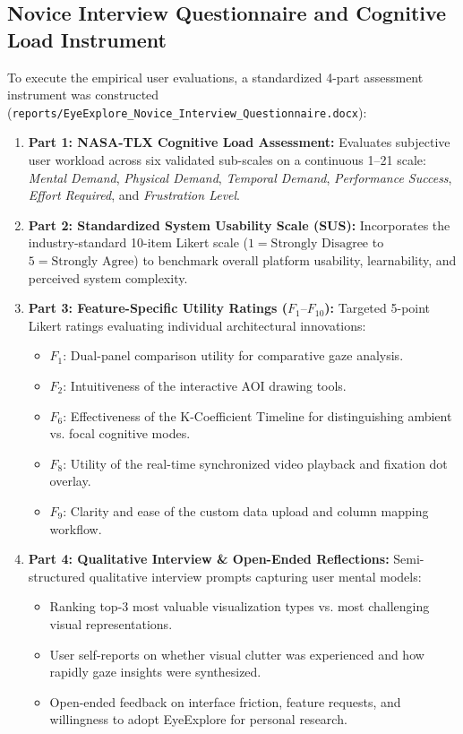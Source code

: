 \documentclass[11pt,a4paper]{article}
\begin{document}
\subsection{Novice Interview Questionnaire and Cognitive Load Instrument}
To execute the empirical user evaluations, a standardized 4-part assessment instrument was constructed (\texttt{reports/EyeExplore\_Novice\_Interview\_Questionnaire.docx}):
\begin{enumerate}
    \item \textbf{Part 1: NASA-TLX Cognitive Load Assessment:} Evaluates subjective user workload across six validated sub-scales on a continuous 1--21 scale: \textit{Mental Demand}, \textit{Physical Demand}, \textit{Temporal Demand}, \textit{Performance Success}, \textit{Effort Required}, and \textit{Frustration Level}.
    \item \textbf{Part 2: Standardized System Usability Scale (SUS):} Incorporates the industry-standard 10-item Likert scale ($1 = \text{Strongly Disagree}$ to $5 = \text{Strongly Agree}$) to benchmark overall platform usability, learnability, and perceived system complexity.
    \item \textbf{Part 3: Feature-Specific Utility Ratings ($F_1\text{--}F_{10}$):} Targeted 5-point Likert ratings evaluating individual architectural innovations:
    \begin{itemize}[noitemsep,topsep=2pt]
        \item $F_1$: Dual-panel comparison utility for comparative gaze analysis.
        \item $F_2$: Intuitiveness of the interactive AOI drawing tools.
        \item $F_6$: Effectiveness of the K-Coefficient Timeline for distinguishing ambient vs. focal cognitive modes.
        \item $F_8$: Utility of the real-time synchronized video playback and fixation dot overlay.
        \item $F_9$: Clarity and ease of the custom data upload and column mapping workflow.
    \end{itemize}
    \item \textbf{Part 4: Qualitative Interview \& Open-Ended Reflections:} Semi-structured qualitative interview prompts capturing user mental models:
    \begin{itemize}[noitemsep,topsep=2pt]
        \item Ranking top-3 most valuable visualization types vs. most challenging visual representations.
        \item User self-reports on whether visual clutter was experienced and how rapidly gaze insights were synthesized.
        \item Open-ended feedback on interface friction, feature requests, and willingness to adopt EyeExplore for personal research.
    \end{itemize}
\end{enumerate}
\end{document}
